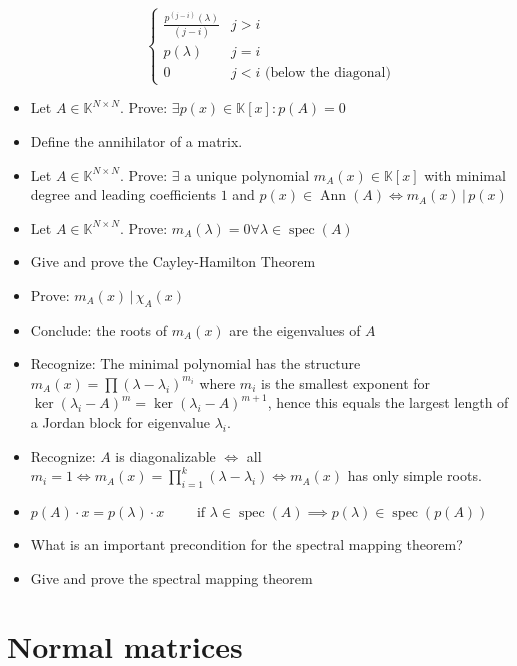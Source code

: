 \documentclass[a4paper]{article}
\newcommand{\divides}{\,\big|\,} %
\begin{document}
\begin{itemize}
\[\begin{cases}
        \frac{p^{(j - i)}(\lambda)}{(j - i)} & j > i \\
        p(\lambda) & j = i \\
        0 & j < i \text{ (below the diagonal)}
      \end{cases}
    \]
  \item Let $A \in \mathbb K^{N \times N}$. Prove: $\exists p(x) \in \mathbb K[x]: p(A) = 0$
  \item Define the annihilator of a matrix.
  \item Let $A \in \mathbb K^{N \times N}$. Prove: $\exists$ a unique polynomial $m_A(x) \in \mathbb K[x]$ with minimal degree and leading coefficients $1$ and $p(x) \in \operatorname{Ann}(A) \iff m_A(x) \divides{} p(x)$
  \item Let $A \in \mathbb K^{N \times N}$. Prove: $m_A(\lambda) = 0 \forall \lambda \in \operatorname{spec}(A)$
  \item Give and prove the Cayley-Hamilton Theorem
  \item Prove: $m_A(x) \divides{} \chi_A(x)$
  \item Conclude: the roots of $m_A(x)$ are the eigenvalues of $A$
  \item Recognize: The minimal polynomial has the structure $m_A(x) = \prod (\lambda - \lambda_i)^{m_i}$ where $m_i$ is the smallest exponent for $\ker(\lambda_i - A)^m = \ker(\lambda_i - A)^{m+1}$, hence this equals the largest length of a Jordan block for eigenvalue $\lambda_i$.
  \item Recognize: $A$ is diagonalizable $\iff$ all $m_i = 1 \iff m_A(x) = \prod_{i=1}^k (\lambda - \lambda_i) \iff m_A(x)$ has only simple roots.
  \item $p(A) \cdot x = p(\lambda) \cdot x \qquad \text{ if } \lambda \in \operatorname{spec}(A) \implies p(\lambda) \in \operatorname{spec}(p(A))$
  \item What is an important precondition for the spectral mapping theorem?
  \item Give and prove the spectral mapping theorem
\end{itemize}

\section{Normal matrices}
\end{document}
